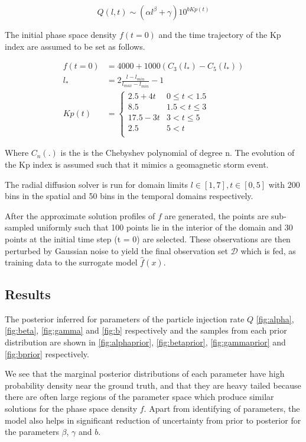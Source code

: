 \begin{equation}\label{eq:q}
Q(l,t)  \sim (\alpha l^{\beta} + \gamma) 10^{b Kp(t)}
\end{equation}

The initial phase space density $f(t = 0)$ and the time trajectory 
of the Kp index are assumed to be set as follows.

\begin{align}
f(t = 0) &= 4000 + 1000(C_{3}(l_*) - C_{5}(l_*)) \\
l_* &= 2\frac{l - l_{min}}{l_{max} - l_{min}} - 1 \\
Kp(t) &= \left\{\begin{matrix}
2.5 + 4t & 0 \leq t < 1.5\\ 
8.5 & 1.5 < t \leq 3\\ 
17.5-3t & 3 <  t \leq 5 \\ 
2.5 & 5 < t\\ 
\end{matrix}\right.
\end{align}

Where $C_n(.)$ is the is the Chebyshev polynomial of degree n. 
The evolution of the Kp index \citet{BartelsKp} is assumed such that it mimics a geomagnetic storm event. 

The radial diffusion solver is run for domain limits $l \in [1, 7], t \in [0, 5]$ with
200 bins in the spatial and 50 bins in the temporal domains respectively.

After the approximate solution profiles of $f$ are generated, the points are sub-sampled
uniformly such that 100 points lie in the interior of the domain and 30 points at the initial time step (t = 0) are selected. These observations are then perturbed by Gaussian noise to yield
the final observation set $\mathcal{D}$ which is fed, as training data to the surrogate model $\hat{f}(x)$.

\subsection*{Results}

The posterior inferred for parameters of the particle injection rate $Q$ \ref{fig:alpha}, 
\ref{fig:beta}, \ref{fig:gamma} and \ref{fig:b} respectively and the samples from each prior distribution are shown in \ref{fig:alphaprior}, \ref{fig:betaprior}, \ref{fig:gammaprior} and \ref{fig:bprior} respectively.

We see that the marginal posterior distributions of each parameter have high probability 
density near the ground truth, and that they are heavy tailed because there are often large 
regions of the parameter space which produce similar solutions for the phase space density $f$. 
Apart from identifying of parameters, the model also helps in significant reduction of uncertainty
from prior to posterior for the parameters $\beta$, $\gamma$ and $b$.

